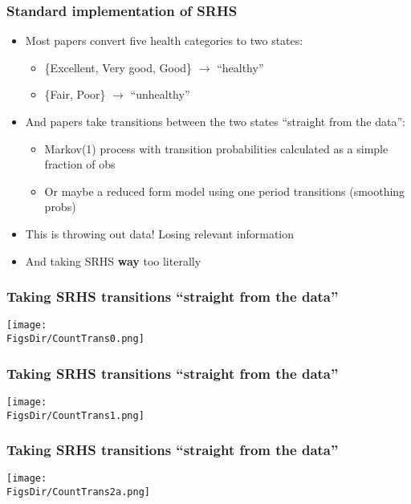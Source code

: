 \documentclass[aspectratio=169]{beamer}
\newcommand{\FigsDir}{../Figures}
\begin{document}
\begin{frame}\frametitle{Standard implementation of SRHS}
\begin{itemize}
	\item <1->Most papers convert five health categories to two states:
	\begin{itemize}
		\item <1->\{Excellent, Very good, Good\} $\longrightarrow$ ``healthy''
		
		\item <1->\{Fair, Poor\} $\longrightarrow$ ``unhealthy''
	\end{itemize}
	
	\item <3->And papers take transitions between the two states ``straight from the data'':
	\begin{itemize}
		\item <3->Markov(1) process with transition probabilities calculated as a simple fraction of obs
		
		\item <3->Or maybe a reduced form model using one period transitions (smoothing probs)
	\end{itemize}
    \item <2->This is throwing out data! Losing relevant information

	\item <4->And taking SRHS \textbf{way} too literally
\end{itemize}
\end{frame}


\begin{frame}\frametitle{Taking SRHS transitions ``straight from the data''}
\begin{center}
	\texttt{[image: \\FigsDir/CountTrans0.png]}
\end{center}
\end{frame}


\begin{frame}\frametitle{Taking SRHS transitions ``straight from the data''}
\begin{center}
	\texttt{[image: \\FigsDir/CountTrans1.png]}
\end{center}
\end{frame}


\begin{frame}\frametitle{Taking SRHS transitions ``straight from the data''}
\begin{center}
	\texttt{[image: \\FigsDir/CountTrans2a.png]}
\end{center}
\end{frame}
\end{document}
